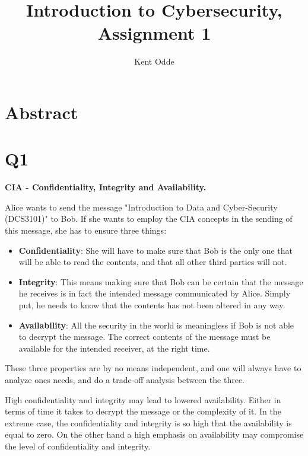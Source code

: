 \documentclass{article}
\begin{document}
\author{Kent Odde}
\title{Introduction to Cybersecurity, Assignment 1}

\maketitle

\newpage

\tableofcontents

\newpage

\section{Abstract}

\section{Q1}

\textbf{CIA - Confidentiality, Integrity and Availability.}

Alice wants to send the message "Introduction to Data and Cyber-Security (DCS3101)" to Bob. If she wants to employ the CIA concepts in the sending of this message, she has to ensure three things:
\begin{itemize}
\item{\textbf{Confidentiality}: She will have to make sure that Bob is the only one that will be able to read the contents, and that all other third parties will not.}
\item{\textbf{Integrity}: This means making sure that Bob can be certain that the message he receives is in fact the intended message communicated by Alice. Simply put, he needs to know that the contents has not been altered in any way.}
\item{\textbf{Availability}: All the security in the world is meaningless if Bob is not able to decrypt the message. The correct contents of the message must be available for the intended receiver, at the right time.}
\end{itemize}

These three properties are by no means independent, and one will always have to analyze ones needs, and do a trade-off analysis between the three.

High confidentiality and integrity may lead to lowered availability. Either in terms of time it takes to decrypt the message or the complexity of it. In the extreme case, the confidentiality and integrity is so high that the availability is equal to zero. On the other hand a high emphasis on availability may compromise the level of confidentiality and integrity. 
\end{document}
